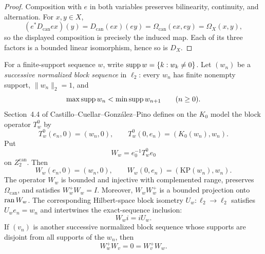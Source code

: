 \begin{proof}
Composition with $e$ in both variables preserves bilinearity, continuity, and alternation.  For
$x,y\in X$,
\[
  (e^*D_{\mathrm{can}}ex)(y)=D_{\mathrm{can}}(ex)(ey)
  =\Omega_{\mathrm{can}}(ex,ey)=\Omega_X(x,y),
\]
so the displayed composition is precisely the induced map.  Each of its three factors is a bounded
linear isomorphism, hence so is $D_X$.
\end{proof}

\begin{theorem}\label{thm:block-primary}
For a finite-support sequence $w$, write $\operatorname{supp} w=\{k:w_k\ne0\}$.  Let $(w_n)$ be a
\emph{successive normalized block sequence} in $\ell_2$: every $w_n$ has finite nonempty support,
$\|w_n\|_2=1$, and
\[
  \max\operatorname{supp} w_n<\min\operatorname{supp} w_{n+1}\qquad(n\geq0).
\]
Section~4.4 of Castillo--Cuellar--Gonz\'alez--Pino defines on the $K_0$ model the block operator
$T_w^0$ by
\[
  T_w^0(e_n,0)=(w_n,0),
  \qquad
  T_w^0(0,e_n)=(K_0(w_n),w_n).
\]
Put
\[
  W_w=e_0^{-1}T_w^0e_0
\]
on $Z_2^{\mathrm{can}}$.  Then
\[
  W_w(e_n,0)=(w_n,0),
  \qquad
  W_w(0,e_n)=(\mathrm{KP}(w_n),w_n).
\]
The operator $W_w$ is bounded and injective with complemented range, preserves
$\Omega_{\mathrm{can}}$, and satisfies $W_w^+W_w=I$.  Moreover, $W_wW_w^+$ is a bounded projection
onto $\operatorname{ran} W_w$.  The corresponding Hilbert-space block isometry $U_w:\ell_2\to\ell_2$ satisfies
$U_we_n=w_n$ and intertwines the exact-sequence inclusion:
\[
  W_wi=iU_w.
\]
If $(v_n)$ is another successive normalized block sequence whose supports are disjoint from all
supports of the $w_n$, then
\[
  W_w^+W_v=0=W_v^+W_w.
\]
\leanok
\end{theorem}

